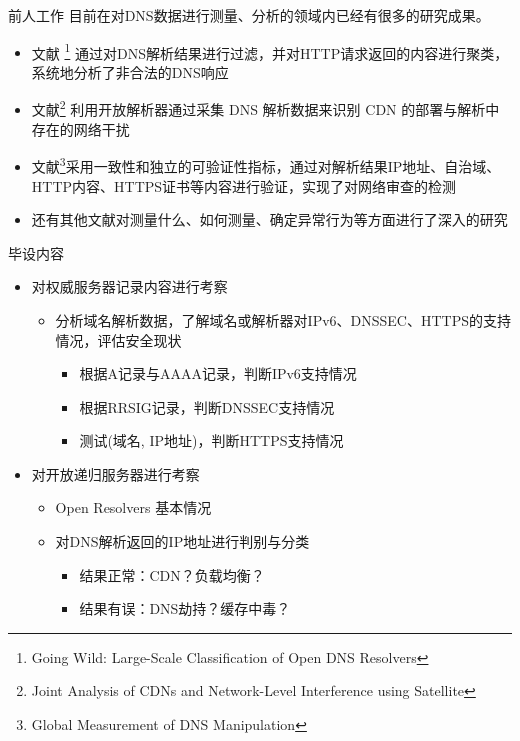 \documentclass{beamer}
\begin{document}
\begin{frame}{前人工作}
  目前在对DNS数据进行测量、分析的领域内已经有很多的研究成果。
  \begin{itemize}
    
    \item 文献 \cite{Kuhrer2015}\footnote[1]{Going Wild: Large-Scale Classification of Open DNS Resolvers} 通过对DNS解析结果进行过滤，并对HTTP请求返回的内容进行聚类，系统地分析了非合法的DNS响应
    \item 文献\cite{Scott2016}\footnote[2]{Joint Analysis of CDNs and Network-Level Interference using Satellite} 利用开放解析器通过采集 DNS 解析数据来识别 CDN 的部署与解析中存在的网络干扰
    \item 文献\cite{Pearce2017}\footnote[3]{Global Measurement of DNS Manipulation}采用一致性和独立的可验证性指标，通过对解析结果IP地址、自治域、HTTP内容、HTTPS证书等内容进行验证，实现了对网络审查的检测
    \item 还有其他文献对测量什么、如何测量、确定异常行为等方面进行了深入的研究
  \end{itemize}
\end{frame}
\begin{frame}{毕设内容}
  \begin{itemize}
    \item 对权威服务器记录内容进行考察
    \begin{itemize}
      \item 分析域名解析数据，了解域名或解析器对IPv6、DNSSEC、HTTPS的支持情况，评估安全现状
      \begin{itemize}
        \item 根据A记录与AAAA记录，判断IPv6支持情况  
        \item 根据RRSIG记录，判断DNSSEC支持情况
        \item 测试(域名, IP地址)，判断HTTPS支持情况
      \end{itemize}
    \end{itemize}
    \item 对开放递归服务器进行考察
    \begin{itemize}
      \item Open Resolvers 基本情况
      \item 对DNS解析返回的IP地址进行判别与分类
      \begin{itemize}
        \item 结果正常：CDN？负载均衡？
        \item 结果有误：DNS劫持？缓存中毒？
      \end{itemize}
    \end{itemize}
  \end{itemize}
  
\end{frame}
\end{document}
